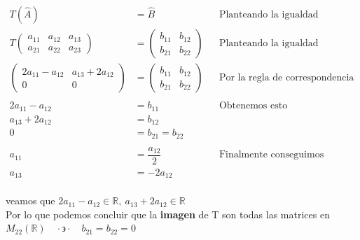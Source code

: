 \documentclass[letterpaper]{article}
\newcommand{\tq}{ \quad \cdot  \backepsilon \cdot \quad }
\newcommand{\R}{\mathds{R}}
\renewcommand{\*}{\cdot}
\theoremstyle{definition}
\begin{document}
	\begin{align*}
			T(\hat{A}) & = \hat{B} && \text{Planteando la igualdad }\\
			T\begin{pmatrix}
			a_{11} & a_{12} & a_{13}\\
			a_{21} & a_{22} & a_{23}
			\end{pmatrix} & = \begin{pmatrix}
			b_{11} & b_{12}\\
			b_{21} & b_{22}
			\end{pmatrix} && \text{Planteando la igualdad}\\
			\begin{pmatrix} 
			2a_{11} - a_{12} & a_{13} + 2a_{12} \\ 
			0 & 0 \end{pmatrix} &= \begin{pmatrix}
			b_{11} & b_{12}\\
			b_{21} & b_{22}
			\end{pmatrix} && \text{Por la regla de correspondencia de T}\\
			\\
			2a_{11} - a_{12} & = b_{11} && \text{Obtenemos esto }\\
			a_{13} + 2a_{12} & = b_{12} && \text{ }\\
			0 &= b_{21} = b_{22} && \\
			\\
			a_{11} & = \dfrac{ a_{12}}{2} && \text{Finalmente conseguimos }\\
			a_{13} & = -2a_{12} && \text{ }\\
	\end{align*}
	\begin{center}
		veamos que $ 2a_{11} - a_{12}  \in \R , \ a_{13} + 2a_{12} \in \R $\\
		Por lo que podemos concluir que la \textbf{imagen} de T son todas las matrices en $ M_{22}(\R) \tq b_{21} = b_{22} = 0 $
	\end{center}
\end{document}
